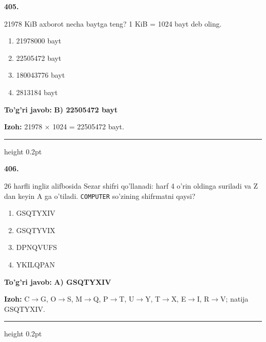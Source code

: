 \documentclass[10pt,a4paper,oneside]{article}
\begin{document}
\noindent\textbf{\color{ink}405.}
\par
21978 KiB axborot necha baytga teng? 1 KiB = 1024 bayt deb oling.
\begin{enumerate}[label=\Alph*),leftmargin=9mm]
\item 21978000 bayt
\item 22505472 bayt
\item 180043776 bayt
\item 2813184 bayt
\end{enumerate}
\begin{tcolorbox}[enhanced,breakable,colback=teal!4,colframe=teal!50!black,boxrule=0.5pt,arc=1.1mm,left=3mm,right=3mm,top=1.7mm,bottom=1.7mm,before skip=2mm,after skip=2mm]
\textbf{\color{teal}To'g'ri javob:} \textbf{B) 22505472 bayt}
\par\smallskip
\textbf{Izoh:} 21978 \ensuremath{\times} 1024 = 22505472 bayt.
\end{tcolorbox}
\vspace{2mm}\hrule height 0.2pt \vspace{3mm}

\noindent\textbf{\color{ink}406.}
\par
26 harfli ingliz alifbosida Sezar shifri qo'llanadi: harf 4 o'rin oldinga suriladi va Z dan keyin A ga o'tiladi. \texttt{COMPUTER} so'zining shifrmatni qaysi?
\begin{enumerate}[label=\Alph*),leftmargin=9mm]
\item GSQTYXIV
\item GSQTYVIX
\item DPNQVUFS
\item YKILQPAN
\end{enumerate}
\begin{tcolorbox}[enhanced,breakable,colback=teal!4,colframe=teal!50!black,boxrule=0.5pt,arc=1.1mm,left=3mm,right=3mm,top=1.7mm,bottom=1.7mm,before skip=2mm,after skip=2mm]
\textbf{\color{teal}To'g'ri javob:} \textbf{A) GSQTYXIV}
\par\smallskip
\textbf{Izoh:} C\ensuremath{\to}G, O\ensuremath{\to}S, M\ensuremath{\to}Q, P\ensuremath{\to}T, U\ensuremath{\to}Y, T\ensuremath{\to}X, E\ensuremath{\to}I, R\ensuremath{\to}V; natija GSQTYXIV.
\end{tcolorbox}
\vspace{2mm}\hrule height 0.2pt \vspace{3mm}
\end{document}
